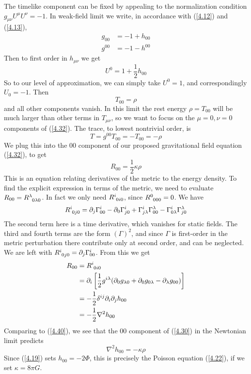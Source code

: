 The timelike component can be fixed by appealing to the normalization condition $g_{\mu\nu}U^\mu U^\nu=-1$. In weak-field limit we write, in accordance with (\ref{4.12}) and (\ref{4.13}),
\begin{align*}
    g_{00}&=-1+h_{00}\\
    g^{00}&=-1-h^{00}
\end{align*}
Then to first order in $h_{\mu\nu}$ we get
\begin{equation*}
    U^0=1+\frac{1}{2}h_{00}
\end{equation*}
So to our level of approximation, we can simply take $U^0=1$, and correspondingly $U_0=-1$. Then
\begin{equation*}
    T_{00}=\rho
\end{equation*}
and all other components vanish. In this limit the rest energy $\rho=T_{00}$ will be much larger than other terms in $T_{\mu\nu}$, so we want to focus on the $\mu=0, \nu=0$ components of (\ref{4.32}). The trace, to lowest nontrivial order, is
\begin{equation*}
    T=g^{00}T_{00}=-T_{00}=-\rho
\end{equation*}
We plug this into the $00$ component of our proposed gravitational field equation (\ref{4.32}), to get
\begin{equation}\label{4.40}
    R_{00}=\frac{1}{2}\kappa \rho
\end{equation}
This is an equation relating derivatives of the metric to the energy density. To find the explicit expression in terms of the metric, we need to evaluate $R_{00}=\tensor{R}{^\lambda_{0\lambda 0}}$. In fact we only need $\tensor{R}{^{i}_{0i0}}$, since $\tensor{R}{^0_{000}}=0$. We have
\begin{equation*}
    \tensor{R}{^{i}_{0j0}}=\partial_j\Gamma^{i}_{00}-\partial_0\Gamma^{i}_{j0}+\Gamma^{i}_{j\lambda}\Gamma^{\lambda}_{00}-\Gamma^{i}_{0\lambda}\Gamma^{\lambda}_{j0}
\end{equation*}
The second term here is a time derivative, which vanishes for static fields. The third and fourth terms are the form $(\Gamma)^2$, and since $\Gamma$ is first-order in the metric perturbation there contribute only at second order, and can be neglected. We are left with $ \tensor{R}{^{i}_{0j0}}=\partial_j\Gamma^{i}_{00}$. From this we get
\begin{align*}
    R_{00}&= \tensor{R}{^{i}_{0i0}}\\
    &=\partial_i\left[\frac{1}{2}g^{i\lambda}(\partial_0g_{\lambda 0}+\partial_0g_{0 \lambda}-\partial_\lambda g_{00})\right]\\
    &=-\frac{1}{2}\delta^{ij}\partial_i\partial_j h_{00}\\
    &=-\frac{1}{2}\nabla^2 h_{00}
\end{align*}
Comparing to (\ref{4.40}), we see that the $00$ component of (\ref{4.30}) in the Newtonian limit predicts
\begin{equation*}
    \nabla^2 h_{00}=-\kappa\rho
\end{equation*}
Since (\ref{4.19}) sets $h_{00}=-2\Phi$, this is precisely the Poisson equation (\ref{4.22}), if we set $\kappa=8\pi G$.

